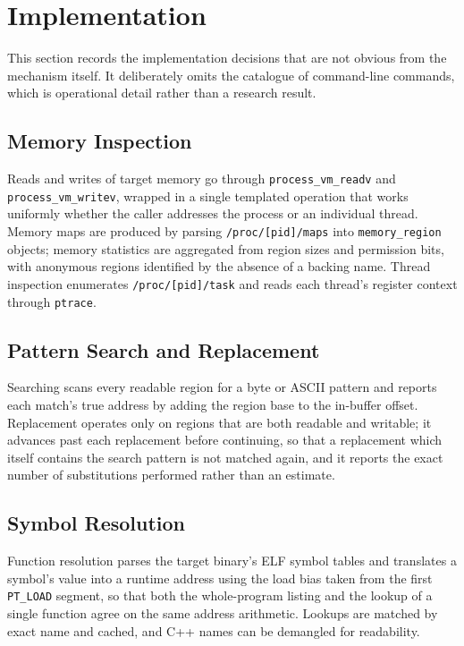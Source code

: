 \documentclass[10pt,twocolumn,a4paper]{article}
\begin{document}
\section{Implementation}\label{sec:impl}
This section records the implementation decisions that are not obvious from the
mechanism itself. It deliberately omits the catalogue of command-line commands,
which is operational detail rather than a research result.

\subsection{Memory Inspection}
Reads and writes of target memory go through \texttt{process\_vm\_readv} and
\texttt{process\_vm\_writev}, wrapped in a single templated operation that works
uniformly whether the caller addresses the process or an individual thread.
Memory maps are produced by parsing \texttt{/proc/[pid]/maps} into
\texttt{memory\_region} objects; memory statistics are aggregated from region
sizes and permission bits, with anonymous regions identified by the absence of a
backing name. Thread inspection enumerates \texttt{/proc/[pid]/task} and reads
each thread's register context through \texttt{ptrace}.

\subsection{Pattern Search and Replacement}
Searching scans every readable region for a byte or ASCII pattern and reports
each match's true address by adding the region base to the in-buffer offset.
Replacement operates only on regions that are both readable and writable; it
advances past each replacement before continuing, so that a replacement which
itself contains the search pattern is not matched again, and it reports the exact
number of substitutions performed rather than an estimate.

\subsection{Symbol Resolution}
Function resolution parses the target binary's ELF symbol tables and translates a
symbol's value into a runtime address using the load bias taken from the first
\texttt{PT\_LOAD} segment, so that both the whole-program listing and the lookup
of a single function agree on the same address arithmetic. Lookups are matched by
exact name and cached, and C++ names can be demangled for readability.
\end{document}
